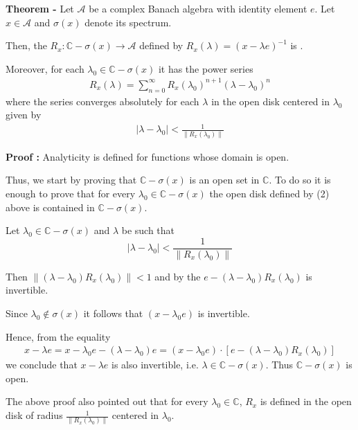 \documentclass[12pt]{article}
\begin{document}
{\bf Theorem -} Let $\mathcal{A}$ be a complex Banach algebra with identity element $e$. Let $x \in \mathcal{A}$ and $\sigma(x)$ denote its spectrum. 

Then, the  $R_x : \mathbb{C}-\sigma(x) \longrightarrow \mathcal{A}$ defined by $R_x(\lambda) = (x-\lambda e)^{-1}$ is . 

Moreover, for each $\lambda_0 \in \mathbb{C} - \sigma(x)$ it has the power series 
\begin{align}
R_x(\lambda) = \sum_{n=0}^{\infty} R_x(\lambda_0)^{n+1}(\lambda -\lambda_0)^n
\end{align}
where the series converges absolutely for each $\lambda$ in the open disk centered in $\lambda_0$ given by
\begin{align}
|\lambda - \lambda_0| < \frac{1}{\|R_x(\lambda_0)\|}
\end{align}

{\bf Proof :} Analyticity is defined for functions whose domain is open. 

Thus, we start by proving that $\mathbb{C} - \sigma(x)$ is an open set in $\mathbb{C}$. To do so it is enough to prove that for every $\lambda_0 \in \mathbb{C} - \sigma(x)$ the open disk defined by (2) above is contained in $\mathbb{C} - \sigma(x)$.

Let $\lambda_0 \in \mathbb{C} - \sigma(x)$ and $\lambda$ be such that
\begin{displaymath}
|\lambda - \lambda_0| < \frac{1}{\|R_x(\lambda_0)\|}
\end{displaymath}

Then $\|(\lambda - \lambda_0)R_x(\lambda_0)\| < 1$ and by the  $e - (\lambda - \lambda_0)R_x(\lambda_0)$ is invertible.

Since $\lambda_0 \notin \sigma(x)$ it follows that $(x-\lambda_0 e)$ is invertible.

Hence, from the equality
\begin{align}
x-\lambda e = x- \lambda_0 e - (\lambda - \lambda_0)e = (x-\lambda_0 e)\cdot [e - (\lambda - \lambda_0)R_x(\lambda_0)]
\end{align}
we conclude that $x - \lambda e$ is also invertible, i.e. $\lambda \in \mathbb{C} - \sigma(x)$. Thus $\mathbb{C} - \sigma(x)$ is open.

The above proof also pointed out that for every $\lambda_0 \in \mathbb{C}$, $R_x$ is defined in the open disk of radius $\displaystyle \frac{1}{\|R_x(\lambda_0)\|}$ centered in $\lambda_0$.
\end{document}
